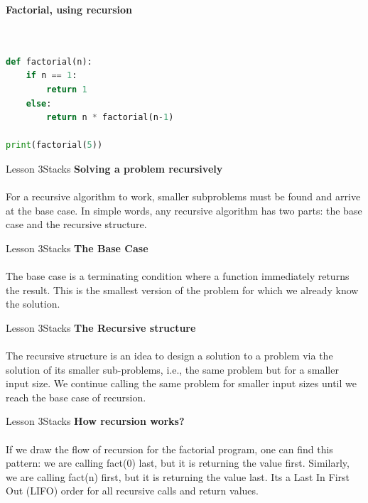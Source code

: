 \documentclass[aspectratio=1610]{beamer}
\begin{document}
\begin{frame}[fragile]
\Large
\textbf{Factorial, using recursion}\\~\\
\begin{lstlisting}[language=Python]

def factorial(n):
    if n == 1:
        return 1
    else:
        return n * factorial(n-1)

print(factorial(5))
 \end{lstlisting}
\end{frame} 


\begin{frame}{Lesson 3}{Stacks}
\LARGE
\textbf{Solving a problem recursively}\\~\\
For a recursive algorithm to work, smaller subproblems must
be found and arrive at the base case. In simple words, any recursive
algorithm has two parts: the base case and the recursive structure.
\end{frame}


\begin{frame}{Lesson 3}{Stacks}
\LARGE
\textbf{The Base Case}\\~\\
The base case is a terminating condition where a function
immediately returns the result. This is the smallest version of the
problem for which we already know the solution.
\end{frame}

\begin{frame}{Lesson 3}{Stacks}
\LARGE
\textbf{The Recursive structure}\\~\\
The recursive structure is an idea to design a solution to a problem
via the solution of its smaller sub-problems, i.e., the same problem
but for a smaller input size. We continue calling the same problem
for smaller input sizes until we reach the base case of recursion.
\end{frame}



\begin{frame}{Lesson 3}{Stacks}
\LARGE
\textbf{How recursion works?}\\~\\

If we draw the flow of recursion for the factorial program, one can
find this pattern: we are calling fact(0) last, but it is returning
the value first. Similarly, we are calling fact(n) first, but it is
returning the value last. Its a Last In First Out (LIFO) order for
all recursive calls and return values.
\end{frame}
\end{document}
